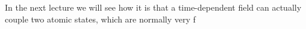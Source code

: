 In the next lecture we will see how it is that a time-dependent field can actually couple two atomic states, which are normally very f